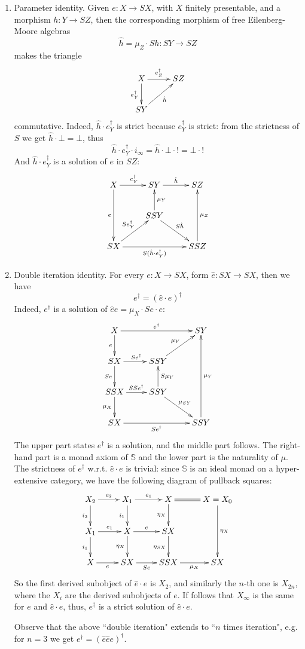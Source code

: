\documentclass{LMCS}
\theoremstyle{plain}
\theoremstyle{definition}
\numberwithin{equation}{section}
\begin{document}
\begin{exa}
\begin{enumerate}[label=\({\alph*}]
\item Parameter identity. Given $e:X\to SX$, with $X$ finitely presentable, and a morphism $h:Y\to SZ$, then the corresponding morphism of free Eilenberg-Moore algebras
$$\hat h=\mu_Z\cdot Sh:SY\to SZ$$
makes the triangle
$$\xymatrix{
X\ar[r]^-{e_Z^\dag}\ar[d]_{e^\dag_Y}&SZ\\
SY\ar[ru]_-{\hat h}
}$$
commutative. Indeed, $\hat h\cdot e^\dag_Y$ is strict because $e^\dag_Y$ is strict: from the strictness of $S$ we get $\hat h\cdot \bot=\bot$, thus
$$\hat h\cdot e^\dag_Y\cdot i_\infty=\hat h\cdot \bot\cdot !=\bot\cdot !$$
And $\hat h\cdot e^\dag_Y$ is a solution of $e$ in $SZ$:
$$\xymatrix{
X\ar[r]^{e_Y^\dag}\ar[dd]_-e&SY\ar[r]^-{\hat h}&SZ\\
&SSY\ar[u]_-{\mu_Y}\ar[rd]^-{S\hat h}\\
SX\ar[ru]^-{Se_Y^\dag}\ar[rr]_-{S(\hat h\cdot e^\dag_Y)}&&SSZ\ar[uu]_-{\mu_Z}
}$$

\item Double iteration identity. For every $e:X\to SX$, form $\hat e: SX \to SX$, then we have $$e^\dag=(\hat e\cdot e)^\dag$$
Indeed, $e^\dag$ is a solution of $\hat ee=\mu_X\cdot Se\cdot e$:
$$\xymatrix{
X\ar[rr]^-{e^\dag}\ar[d]_-e&&SY\\
SX\ar[r]^{Se^\dag}\ar[d]_-{Se}&SSY\ar[ru]^-{\mu_Y}\\
SSX\ar[r]^{SSe^\dag}\ar[d]_-{\mu_X}&SSY\ar[u]_-{S\mu_Y}\ar[rd]^-{\mu_{SY}}\\
SX\ar[rr]_-{Se^\dag}&&SSY\ar[uuu]_-{\mu_Y}
}$$
The upper part states $e^\dag$ is a solution, and the middle part
follows. The right-hand part is a monad axiom of $\mathbb S$ and the
lower part is the naturality of $\mu$. The strictness of $e^\dag$
w.r.t. $\hat e\cdot e$ is trivial: since $\mathbb S$ is an ideal monad on a hyper-extensive category,
we have the following diagram of pullback squares:
$$\xymatrix{
X_2\ar[r]^-{e_2}\ar[d]_-{i_2}&X_1\ar[r]^-{e_1}\ar[d]_-{i_1}&X\ar@{=}[r]\ar[d]_-{\eta_X}&X=X_0\ar[dd]^-{\eta_X}\\
X_1\ar[r]^-{e_1}\ar[d]_-{i_1}&X\ar[d]_-{\eta_X}\ar[r]^-e&SX\ar[d]_{\eta_{SX}}\\
X\ar[r]_-e&SX\ar[r]_-{Se}&SSX\ar[r]_-{\mu_X}&SX
}$$
So the first derived subobject of $\hat e\cdot e$ is $X_{2}$, and
similarly the $n$-th one is $X_{2n}$, where the $X_i$
are the derived subobjects of $e$. If follows that $X_\infty$ is the same for $e$ and $\hat e\cdot e$, thus, $e^\dag$ is a strict solution of $\hat e\cdot e$.

Observe that the above ``double iteration" extends to ``$n$ times iteration", e.g. for $n=3$ we get $e^\dag=(\hat e\hat e e)^\dag$.


\end{enumerate}
\end{exa}
\end{document}
